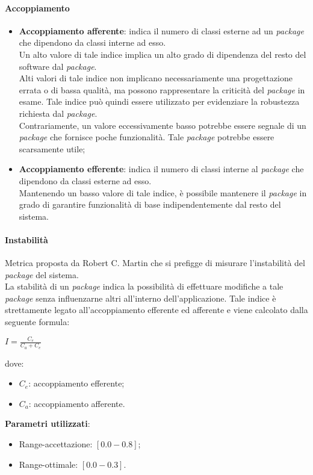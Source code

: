 \paragraph{Accoppiamento}
\begin{itemize}
\item \textbf{Accoppiamento afferente}: indica il numero di classi esterne ad un \textit{package} che dipendono da classi interne ad esso.\\
Un alto valore di tale indice implica un alto grado di dipendenza del resto del software dal \textit{package}.\\
Alti valori di tale indice non implicano necessariamente una progettazione errata o di bassa qualità, ma possono rappresentare la criticità del \textit{package} in esame. Tale indice può quindi essere utilizzato per evidenziare la robustezza richiesta dal \textit{package}.\\
Contrariamente, un valore eccessivamente basso potrebbe essere segnale di un \textit{package} che fornisce poche funzionalità. Tale \textit{package} potrebbe essere scarsamente utile;
\item \textbf{Accoppiamento efferente}: indica il numero di classi interne al \textit{package} che dipendono da classi esterne ad esso.\\
Mantenendo un basso valore di tale indice, è possibile mantenere il \textit{package} in grado di garantire funzionalità di base indipendentemente dal resto del sistema.
\end{itemize}

\paragraph{Instabilità}
Metrica proposta da Robert C. Martin che si prefigge di misurare l'instabilità del \textit{package} del sistema.\\
La stabilità di un \textit{package} indica la possibilità di effettuare modifiche a tale \textit{package} senza influenzarne altri all'interno dell'applicazione. Tale indice è strettamente legato all'accoppiamento efferente ed afferente e viene calcolato dalla seguente formula:
\begin{center}
$I = \frac{C_e}{C_a+C_e}$
\end{center}
dove:
\begin{itemize}
\item \textbf{$C_e$}: accoppiamento efferente;
\item \textbf{$C_a$}: accoppiamento afferente.
\end{itemize}
\textbf{Parametri utilizzati}:
\begin{itemize}
\item Range-accettazione: $[0.0-0.8]$;
\item Range-ottimale: $[0.0-0.3]$.
\end{itemize}

